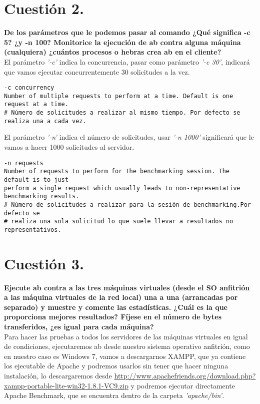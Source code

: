 \documentclass[a4paper, 10pt]{article} %
\begin{document}
\section{Cuestión 2.}
\textbf{De los parámetros que le podemos pasar al comando ¿Qué significa -c 5? ¿y -n 100? Monitorice la ejecución de ab contra alguna máquina (cualquiera) ¿cuántos procesos o hebras crea ab en el cliente?}\\

El parámetro \textit{'-c'} indica la concurrencia\cite{5}, pasar como parámetro \textit{'-c 30'}, indicará que vamos ejecutar concurrentemente 30 solicitudes a la vez.
\begin{verbatim}
-c concurrency
Number of multiple requests to perform at a time. Default is one request at a time.
# Número de solicitudes a realizar al mismo tiempo. Por defecto se realiza una a cada vez.
\end{verbatim}
El parámetro \textit{'-n'} indica el número de solicitudes, usar \textit{'-n 1000'} significará que le vamos a hacer 1000 solicitudes al servidor.
\begin{verbatim}
-n requests
Number of requests to perform for the benchmarking session. The default is to just
perform a single request which usually leads to non-representative benchmarking results.
# Número de solicitudes a realizar para la sesión de benchmarking.Por defecto se 
# realiza una sola solicitud lo que suele llevar a resultados no representativos.
\end{verbatim}

\section{Cuestión 3.}
\textbf{Ejecute ab contra a las tres máquinas virtuales (desde el SO anfitrión a las máquina virtuales de la red local) una a una (arrancadas por separado) y muestre y comente las estadísticas. ¿Cuál es la que proporciona mejores resultados? Fíjese en el número de bytes transferidos, ¿es igual para cada máquina?}\\

Para hacer las pruebas a todos los servidores de las máquinas virtuales en igual de condiciones, ejecutaremos ab desde nuestro sistema operativo anfitrión\cite{5}, como en nuestro caso es Windows 7, vamos a descargarnos XAMPP, que ya contiene los ejecutable de Apache y podremos usarlos sin tener que hacer ninguna instalación, lo descargaremos desde \url{http://www.apachefriends.org/download.php?xampp-portable-lite-win32-1.8.1-VC9.zip} y podremos ejecutar directamente Apache Benchmark, que se encuentra dentro de la carpeta \textit{'apache/bin'}.
\end{document}

